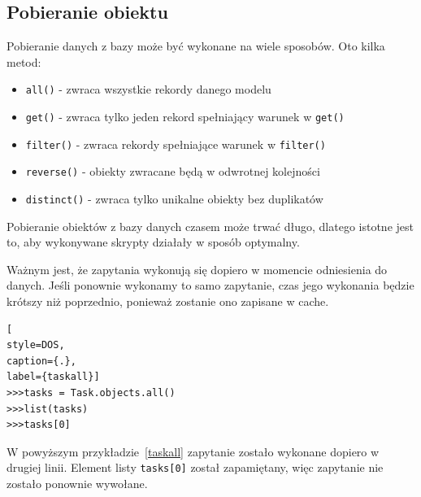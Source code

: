 \documentclass[oneside,polski,logo,indent]{amuthesis}
\begin{document}
\begin{center}
\subsection{Pobieranie obiektu}
\end{center}
Pobieranie danych z bazy może być wykonane na wiele sposobów. Oto kilka metod:
\begin{itemize}
\item \texttt{all()} - zwraca wszystkie rekordy danego modelu
\item \texttt{get()} - zwraca tylko jeden rekord spełniający warunek w \texttt{get()}
\item \texttt{filter()} - zwraca rekordy spełniające warunek w \texttt{filter()}
\item \texttt{reverse()} - obiekty zwracane będą w odwrotnej kolejności
\item \texttt{distinct()} - zwraca tylko unikalne obiekty bez duplikatów
\end{itemize}
Pobieranie obiektów z bazy danych czasem może trwać długo, dlatego istotne jest to, aby wykonywane skrypty działały w sposób optymalny. 

Ważnym jest, że zapytania wykonują się dopiero w momencie odniesienia do danych. Jeśli ponownie wykonamy to samo zapytanie, czas jego wykonania będzie krótszy niż poprzednio, ponieważ zostanie ono zapisane w cache.
\begin{lstlisting}[
style=DOS,
caption={.},
label={taskall}]
>>>tasks = Task.objects.all()
>>>list(tasks)
>>>tasks[0]
\end{lstlisting}
W powyższym przykładzie~\ref{taskall} zapytanie zostało wykonane dopiero w drugiej linii. Element listy \texttt{tasks[0]} został zapamiętany, więc zapytanie nie zostało ponownie wywołane.
\end{document}
